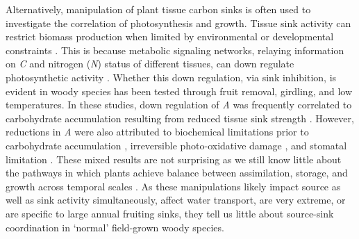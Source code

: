 \documentclass[a4paper]{article}\usepackage[]{graphicx}\usepackage[]{color}
\begin{document}
Alternatively, manipulation of plant tissue carbon sinks is often used to investigate the correlation of photosynthesis and growth. Tissue sink activity can restrict biomass production when limited by environmental or developmental constraints \citep{korner2003carbon}. This is because metabolic signaling networks, relaying information on \textit{C} and nitrogen (\textit{N}) status of different tissues, can down regulate photosynthetic activity \citep{paul2001sink}.  Whether this down regulation, via sink inhibition, is evident in woody species has been tested through fruit removal, girdling, and low temperatures. In these studies, down regulation of \textit{A} was frequently correlated to carbohydrate accumulation resulting from reduced tissue sink strength \citep{iglesias2002regulation,hoch2002altitudinal,urban2007girdling, haouari2013fruit}. However, reductions in \textit{A} were also attributed to biochemical limitations prior to carbohydrate accumulation \citep{nebauer2011photosynthesis}, irreversible photo-oxidative damage \citep{duan2008photosynthetic}, and stomatal limitation \citep{li2005photosynthesis}. These mixed results are not surprising as we still know little about the pathways in which plants achieve balance between assimilation, storage, and growth across temporal scales \citep{smith2007coordination}. As these manipulations likely impact source as well as sink activity simultaneously, affect water transport, are very extreme, or are specific to large annual fruiting sinks, they tell us little about source-sink coordination in ‘normal’ field-grown woody species. 
\end{document}
